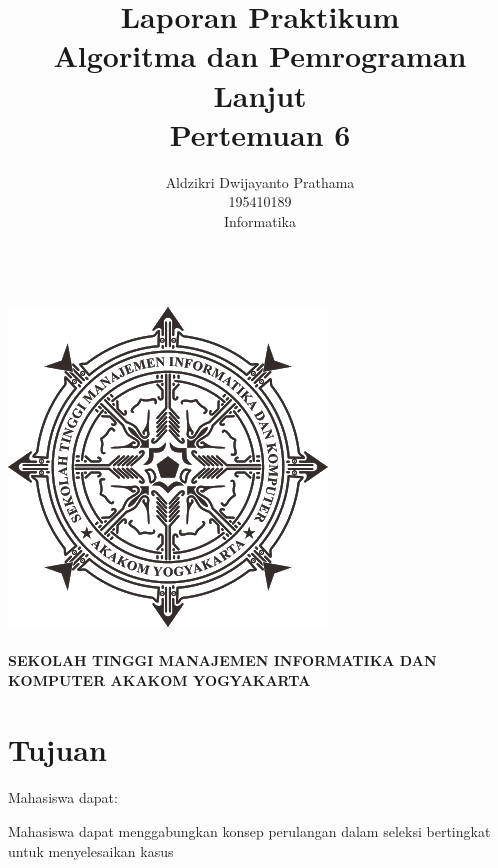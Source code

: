 \documentclass[a4paper,12pt]{article}
\begin{document}
\title{ {\Large Laporan Praktikum}\\ Algoritma dan Pemrograman Lanjut\\{\Large Pertemuan 6}}

\author{Aldzikri Dwijayanto Prathama
    \\195410189
    \\Informatika}
\makeatletter
\begin{titlepage}
    \begin{center}
        {\huge \bfseries \@title}\\[14ex]
        \includegraphics[scale=.8]{logo}\\[4ex]
        {\large \@author}\\[12ex]
        {\large \bfseries {SEKOLAH TINGGI MANAJEMEN INFORMATIKA DAN KOMPUTER
            AKAKOM YOGYAKARTA}}
    \end{center}


\end{titlepage}
\makeatother
\newpage
\tableofcontents
\newpage

\section{Tujuan}
\paragraph{}
Mahasiswa dapat:
\begin{enumerate}
Mahasiswa dapat menggabungkan konsep perulangan dalam seleksi bertingkat untuk menyelesaikan kasus
\end{enumerate}
\end{document}
